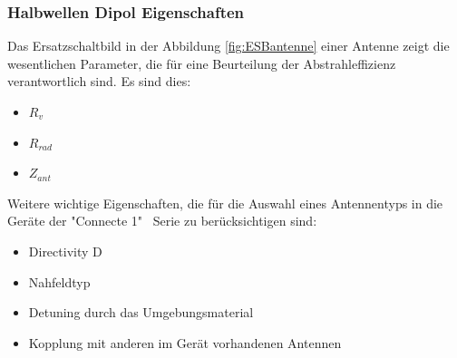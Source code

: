 \subsubsection{Halbwellen Dipol Eigenschaften}
Das Ersatzschaltbild in der Abbildung \ref{fig:ESBantenne} einer Antenne zeigt die wesentlichen Parameter, die für eine Beurteilung der Abstrahleffizienz verantwortlich sind. Es sind dies:
\begin{itemize}
\item $R_{v}$
\item $R_{rad}$
\item $Z_{ant}$
\end{itemize}

Weitere wichtige Eigenschaften, die für die Auswahl eines Antennentyps in die Geräte der "Connecte 1" \  Serie zu berücksichtigen  sind:
\begin{itemize}
\item Directivity D
\item Nahfeldtyp
\item Detuning durch das Umgebungsmaterial
\item Kopplung mit anderen im Gerät vorhandenen Antennen
\end{itemize}

